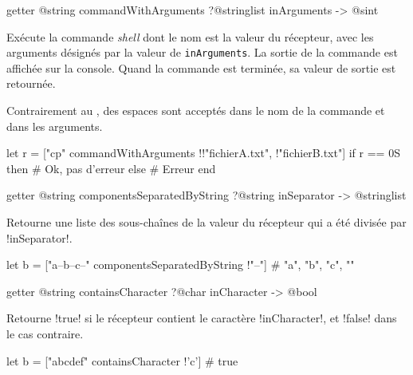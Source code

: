 
\begin{galgasbox}
getter @string commandWithArguments ?@stringlist inArguments -> @sint
\end{galgasbox}
Exécute la commande \emph{shell} dont le nom est la valeur du récepteur, avec les arguments désignés par la valeur de \texttt{inArguments}. La sortie de la commande est affichée sur la console. Quand la commande est terminée, sa valeur de sortie est retournée.

Contrairement au , des espaces sont acceptés dans le nom de la commande et dans les arguments.

\begin{galgas}
let r = ["cp" commandWithArguments !{!"fichierA.txt", !"fichierB.txt"}]
if r == 0S then
  # Ok, pas d'erreur
else
  # Erreur
end
\end{galgas}
















\begin{galgasbox}
getter @string componentsSeparatedByString ?@string inSeparator -> @stringlist
\end{galgasbox}
Retourne une liste des sous-chaînes de la valeur du récepteur qui a été divisée par \ggs!inSeparator!.

\begin{galgas}
let b = ["a--b--c--" componentsSeparatedByString !"--"]
# "a", "b", "c", ""
\end{galgas}













\begin{galgasbox}
getter @string containsCharacter ?@char inCharacter -> @bool
\end{galgasbox}
Retourne \ggs!true! si le récepteur contient le caractère \ggs!inCharacter!, et \ggs!false! dans le cas contraire.

\begin{galgas}
let b = ["abcdef" containsCharacter !'c'] # true
\end{galgas}






